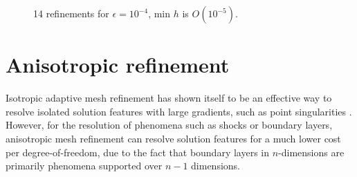 \begin{figure}[!h]
\centering
{}
\caption{14 refinements for $\epsilon = 10^{-4}$, min $h$ is $O(10^{-5})$.}
\label{fig:newNormSmallEps}
\end{figure}

\section{Anisotropic refinement}
Isotropic adaptive mesh refinement has shown itself to be an effective way to resolve isolated solution features with large gradients, such as point singularities \cite{hp1,hp3}. However, for the resolution of phenomena such as shocks or boundary layers, anisotropic mesh refinement can resolve solution features for a much lower cost per degree-of-freedom, due to the fact that boundary layers in $n$-dimensions are primarily phenomena supported over $n-1$ dimensions.  

